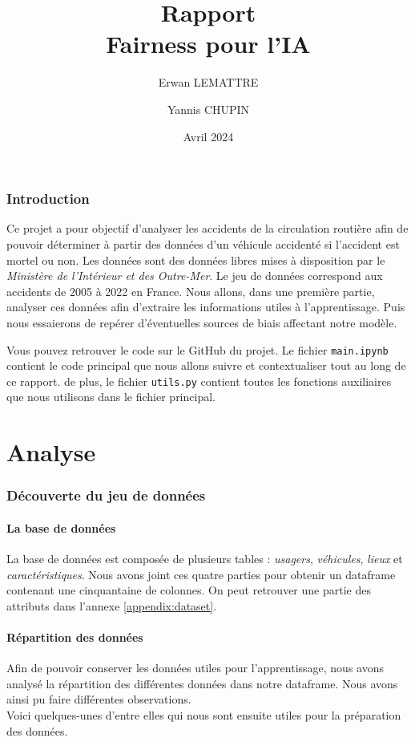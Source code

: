 \documentclass{article}
\author{Erwan LEMATTRE \and Yannis CHUPIN}
\title{Rapport\\Fairness pour l'IA}
\date{Avril 2024}
\begin{document}
    \maketitle
    \newpage
    \tableofcontents
    \newpage

    \section{Introduction}
    Ce projet a pour objectif d'analyser les accidents de la circulation routière afin de pouvoir déterminer 
    à partir des données d'un véhicule accidenté si l'accident est mortel ou non.
    Les données sont des données libres mises à disposition par le \textit{Ministère de l'Intérieur et des 
    Outre-Mer}. Le jeu de données correspond aux accidents de 2005 à 2022 en France. Nous allons, dans une première 
    partie, analyser ces données afin d'extraire les informations utiles à l'apprentissage. Puis nous essaierons de repérer 
    d'éventuelles sources de biais affectant notre modèle.
    
    Vous pouvez retrouver le code sur le GitHub du projet. Le fichier \texttt{main.ipynb} contient 
    le code principal que nous allons suivre et contextualiser tout au long de ce rapport. de plus, le fichier \texttt{utils.py} 
    contient toutes les fonctions auxiliaires que nous utilisons dans le fichier principal.

    \newpage
    \part{Analyse}
    \section{Découverte du jeu de données}
    \subsection{La base de données}
    La base de données est composée de plusieurs tables : \textit{usagers}, \textit{véhicules}, \textit{lieux} et 
    \textit{caractéristiques}. Nous avons joint ces quatre parties pour obtenir un dataframe contenant une 
    cinquantaine de colonnes. 
    On peut retrouver une partie des attributs dans l'annexe \ref{appendix:dataset}.


    \subsection{Répartition des données}
    Afin de pouvoir conserver les données utiles pour l'apprentissage, nous avons analysé la répartition des 
    différentes données dans notre dataframe.
    Nous avons ainsi pu faire différentes observations. 
    \\
    Voici quelques-unes d'entre elles qui nous sont ensuite utiles pour la préparation des données.
\end{document}
